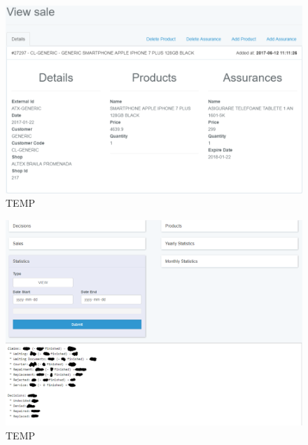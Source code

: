 	\begin{figure}
		\includegraphics[width=\linewidth]{../imagini/sales_view.png}
		\caption{TEMP}
		\label{fig:TEMP}
	\end{figure}
	\begin{figure}
		\includegraphics[width=\linewidth]{../imagini/statistics.png}
		\caption{TEMP}
		\label{fig:TEMP}
	\end{figure}
